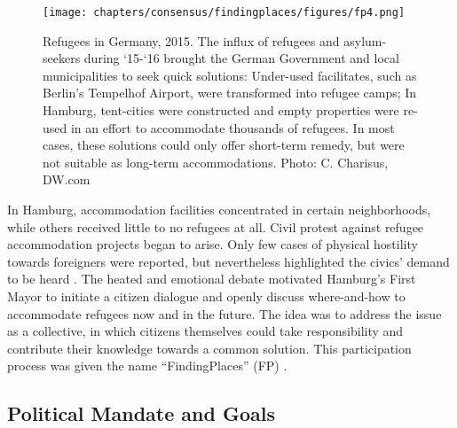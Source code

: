 {{        \begin{figure}[!htb]
            \begin{center}
                \texttt{[image: chapters/consensus/findingplaces/figures/fp4.png]}
            \end{center}
            \caption{
                Refugees in Germany, 2015. The influx of refugees and asylum-seekers during `15-`16 brought the German Government and local municipalities to seek quick solutions: Under-used facilitates, such as Berlin's Tempelhof Airport, were transformed into refugee camps; In Hamburg, tent-cities were constructed and empty properties were re-used in an effort to accommodate thousands of refugees. In most cases, these solutions could only offer short-term remedy, but were not suitable as long-term accommodations. Photo: C. Charisus, DW.com
            }
            \label{fig:fp_refugees_housing}
        \end{figure}


        In Hamburg, accommodation facilities concentrated in certain neighborhoods, while others received little to no refugees at all. Civil protest against refugee accommodation projects began to arise. Only few cases of physical hostility towards foreigners were reported, but nevertheless highlighted the civics' demand to be heard \cite{Antiraci26:online}. The heated and emotional debate motivated Hamburg's First Mayor to initiate a citizen dialogue and openly discuss where-and-how to accommodate refugees now and in the future. The idea was to address the issue as a collective, in which citizens themselves could take responsibility and contribute their knowledge towards a common solution. This participation process was given the name ``FindingPlaces'' (FP) \cite{Hamburge78:online}.
    }

    \subsection{Political Mandate and Goals}
    {

}}
